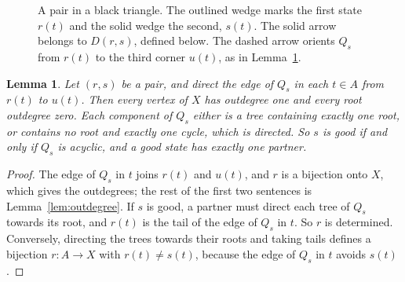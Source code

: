\documentclass[10pt]{amsart}
\numberwithin{equation}{section}
\newtheorem{lemma}[equation]{Lemma}
\theoremstyle{definition}
\theoremstyle{remark}
\begin{document}
\begin{figure}[H]
\centering
\begin{minipage}{0.40\textwidth}\centering
{}
\end{minipage}\hfill
\begin{minipage}{0.56\textwidth}
\caption{A pair in a black triangle. The outlined wedge marks the first state $r(t)$ and the solid wedge the second, $s(t)$. The solid arrow belongs to $D(r,s)$, defined below. The dashed arrow orients $Q_s$ from $r(t)$ to the third corner $u(t)$, as in Lemma~\ref{lem:partner}.}
\label{fig:localpair}
\end{minipage}
\end{figure}

\begin{lemma}\label{lem:partner}
Let $(r,s)$ be a pair, and direct the edge of $Q_s$ in each $t\in A$ from $r(t)$ to $u(t)$.
Then every vertex of $X$ has outdegree one and every root outdegree zero.
Each component of $Q_s$ either is a tree containing exactly one root, or contains no root and exactly one cycle, which is directed.
So $s$ is good if and only if $Q_s$ is acyclic, and a good state has exactly one partner.
\end{lemma}

\begin{proof}
The edge of $Q_s$ in $t$ joins $r(t)$ and $u(t)$, and $r$ is a bijection onto $X$, which gives the outdegrees; the rest of the first two sentences is Lemma~\ref{lem:outdegree}.
If $s$ is good, a partner must direct each tree of $Q_s$ towards its root, and $r(t)$ is the tail of the edge of $Q_s$ in $t$. So $r$ is determined.
Conversely, directing the trees towards their roots and taking tails defines a bijection $r\colon A\to X$ with $r(t)\neq s(t)$, because the edge of $Q_s$ in $t$ avoids $s(t)$.
\end{proof}
\end{document}
